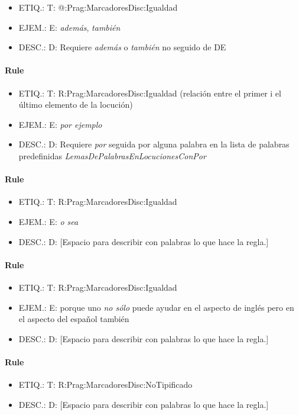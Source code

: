 \documentclass[11pt]{report}
\begin{document}
\begin{itemize}
\item ETIQ.:  T: @:Prag:MarcadoresDisc:Igualdad
\item EJEM.:  E: \emph{además}, \emph{también}
\item DESC.:  D: Requiere \emph{además} o \emph{también} no seguido de DE
\end{itemize}

\paragraph*{Rule}
\begin{itemize}
\item ETIQ.:  T: R:Prag:MarcadoresDisc:Igualdad (relación entre el primer i el último elemento de la locución)
\item EJEM.:  E: \emph{por ejemplo}
\item DESC.:  D: Requiere \emph{por} seguida por alguna palabra en la lista de palabras predefinidas \emph{LemasDePalabrasEnLocucionesConPor}
\end{itemize}

\paragraph*{Rule}
\begin{itemize}
\item ETIQ.:  T: R:Prag:MarcadoresDisc:Igualdad
\item EJEM.:  E: \emph{o sea}
\item DESC.:  D: [Espacio para describir con palabras lo que hace la regla.]
\end{itemize}

\paragraph*{Rule}
\begin{itemize}
\item ETIQ.:  T: R:Prag:MarcadoresDisc:Igualdad
\item EJEM.:  E: porque uno \emph{no sólo} puede ayudar en el aspecto de inglés pero en el aspecto del español también
\item DESC.:  D: [Espacio para describir con palabras lo que hace la regla.]
\end{itemize}

\paragraph*{Rule}
\begin{itemize}
\item ETIQ.:  T: R:Prag:MarcadoresDisc:NoTipificado
\item DESC.:  D: [Espacio para describir con palabras lo que hace la regla.]
\end{itemize}
\end{document}
